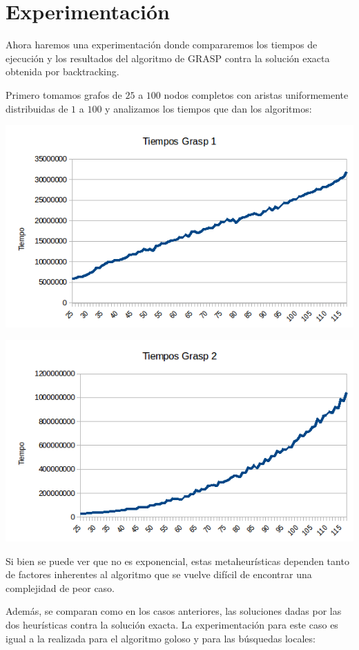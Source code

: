 \section{Experimentación}

Ahora haremos una experimentación donde compararemos los tiempos de ejecución y los resultados del algoritmo de GRASP contra la solución exacta obtenida por backtracking.

Primero tomamos grafos de $25$ a $100$ nodos completos con aristas uniformemente distribuidas de $1$ a $100$ y analizamos los tiempos que dan los algoritmos:

\includegraphics[scale=0.5]{Ej5/tiempog1.png}

\includegraphics[scale=0.5]{Ej5/tiempog2.png}

Si bien se puede ver que no es exponencial, estas metaheurísticas dependen tanto de factores inherentes al algoritmo que se vuelve difícil de encontrar una complejidad de peor caso.

Además, se comparan como en los casos anteriores, las soluciones dadas por las dos heurísticas contra la solución exacta. La experimentación para este caso es igual a la realizada para el algoritmo goloso y para las búsquedas locales:


